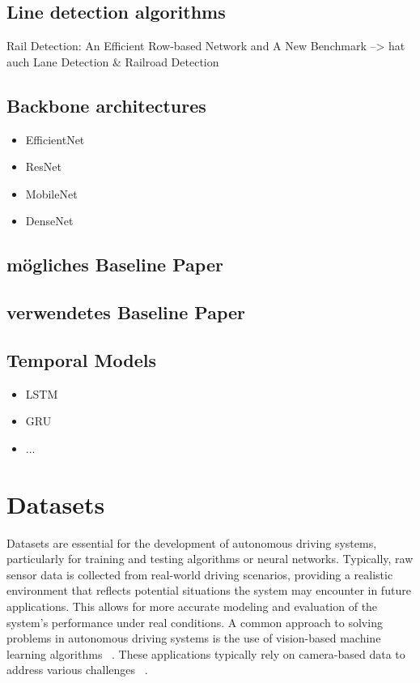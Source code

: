 \subsection{Line detection algorithms}
Rail Detection: An Efficient Row-based Network and A New Benchmark --> hat auch Lane Detection \& Railroad Detection
\subsection{Backbone architectures}

\begin{itemize}
    \item EfficientNet
    \item ResNet
    \item MobileNet
    \item DenseNet
\end{itemize}

\subsection{mögliches Baseline Paper}
\subsection{verwendetes Baseline Paper}
\subsection{Temporal Models}

\begin{itemize}
    \item LSTM
    \item GRU
    \item ...
\end{itemize}

\clearpage
\section{Datasets}

Datasets are essential for the development of autonomous driving systems, particularly for training and testing algorithms or neural networks.
Typically, raw sensor data is collected from real-world driving scenarios, providing a realistic environment that reflects potential situations the system may encounter in future applications.
This allows for more accurate modeling and evaluation of the system's performance under real conditions.
A common approach to solving problems in autonomous driving systems is the use of vision-based machine learning algorithms ~\cite[S.~1221]{railsem19dataset}.
These applications typically rely on camera-based data to address various challenges ~\cite[S.~1221]{railsem19dataset}.

